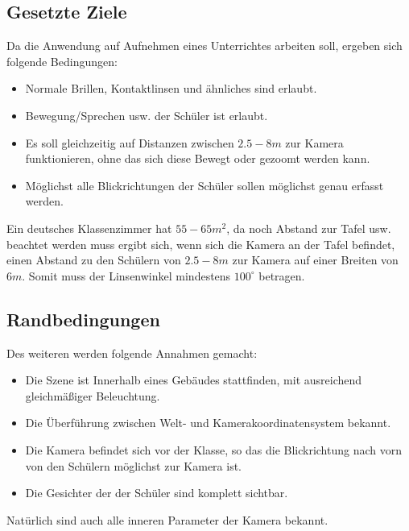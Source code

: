 \subsection{Gesetzte Ziele}
Da die Anwendung auf Aufnehmen eines Unterrichtes arbeiten soll, ergeben sich folgende Bedingungen:
\begin{itemize}
\item Normale Brillen, Kontaktlinsen und ähnliches sind erlaubt.
\item Bewegung/Sprechen usw. der Schüler ist erlaubt.
\item Es soll gleichzeitig auf Distanzen zwischen $2.5 - 8m$ zur Kamera funktionieren, ohne das sich diese Bewegt oder gezoomt werden kann.
\item Möglichst alle Blickrichtungen der Schüler sollen möglichst genau erfasst werden.
\end{itemize}
Ein deutsches Klassenzimmer hat $55-65m^2$, da noch Abstand zur Tafel usw. beachtet werden muss ergibt sich, wenn sich die Kamera an der Tafel befindet, einen Abstand zu den Schülern von $2.5 - 8m$ zur Kamera auf einer Breiten von $6m$. Somit muss der Linsenwinkel mindestens $100^\circ$ betragen.

\subsection{Randbedingungen}
Des weiteren werden folgende Annahmen gemacht:
\begin{itemize}
\item Die Szene ist Innerhalb eines Gebäudes stattfinden, mit ausreichend gleichmäßiger Beleuchtung.
\item Die Überführung zwischen Welt- und Kamerakoordinatensystem bekannt.
\item Die Kamera befindet sich vor der Klasse, so das die Blickrichtung nach vorn von den Schülern möglichst zur Kamera ist.
\item Die Gesichter der der Schüler sind komplett sichtbar.
\end{itemize}
Natürlich sind auch alle inneren Parameter der Kamera bekannt.